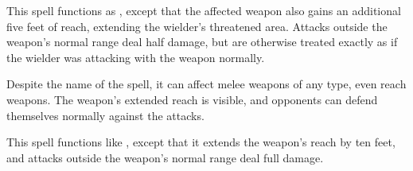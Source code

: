 \spelldur{\durshort}
\begin{spelleffect}
  This spell functions as , except that the affected weapon also gains an additional five feet of reach, extending the wielder's threatened area. Attacks outside the weapon's normal range deal half damage, but are otherwise treated exactly as if the wielder was attacking with the weapon normally.
\end{spelleffect}
\begin{spellnotes}
  Despite the name of the spell, it can affect melee weapons of any type, even reach weapons. The weapon's extended reach is visible, and opponents can defend themselves normally against the attacks.
\end{spellnotes}

\begin{spelleffect}
  This spell functions like , except that it extends the weapon's reach by ten feet, and attacks outside the weapon's normal range deal full damage.
\end{spelleffect}
